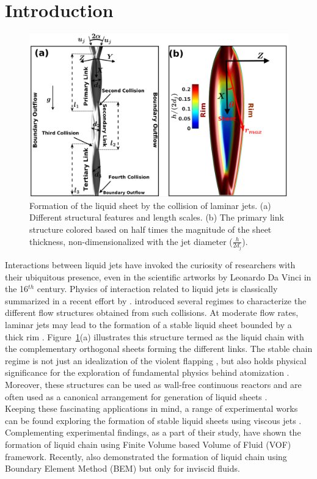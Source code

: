 \documentclass{jfm}
\begin{document}
\section{Introduction}
\begin{figure}
	\centering
	\includegraphics[width=0.545\linewidth]{Figure1}
	\caption{Formation of the liquid sheet by the collision of laminar jets. (a) Different structural features and length scales. (b) The primary link structure colored based on half times the magnitude of the sheet thickness, non-dimensionalized with the jet diameter ($\frac{h}{2d_j}$).}
	\label{Figure::schematic}%
\end{figure}
Interactions between liquid jets have invoked the curiosity of researchers with their ubiquitous presence, even in the scientific artworks by Leonardo Da Vinci in the 16$^{th}$ century. Physics of interaction related to liquid jets is classically summarized in a recent effort by \cite{eggers2008physics}. \cite{bush2004collision} introduced several regimes to characterize the different flow structures obtained from such collisions. At moderate flow rates, laminar jets may lead to the formation of a stable liquid sheet bounded by a thick rim \citep{yang2014liquid}. Figure~\ref{Figure::schematic}(a) illustrates this structure termed as the liquid chain with the complementary orthogonal sheets forming the different links. The stable chain regime is not just an idealization of the violent flapping \citep{villermaux2002life}, but also holds physical significance for the exploration of fundamental physics behind atomization \citep{bremond2006atomization}. Moreover, these structures can be used as wall-free continuous reactors \citep{erni2013free} and are often used as a canonical arrangement for generation of liquid sheets \citep{bush2004collision,taylor1960formation}.\\
Keeping these fascinating applications in mind, a range of experimental works can be found exploring the formation of stable liquid sheets using viscous jets \citep{choo2001parametric,choo2002velocity,bush2004collision}. Complementing experimental findings, as a part of their study, \cite{chen2013high} have shown the formation of liquid chain using Finite Volume based Volume of Fluid (VOF) framework. Recently, \cite{da2016surface} also demonstrated the formation of liquid chain using Boundary Element Method (BEM) but only for inviscid fluids.\\
\end{document}
